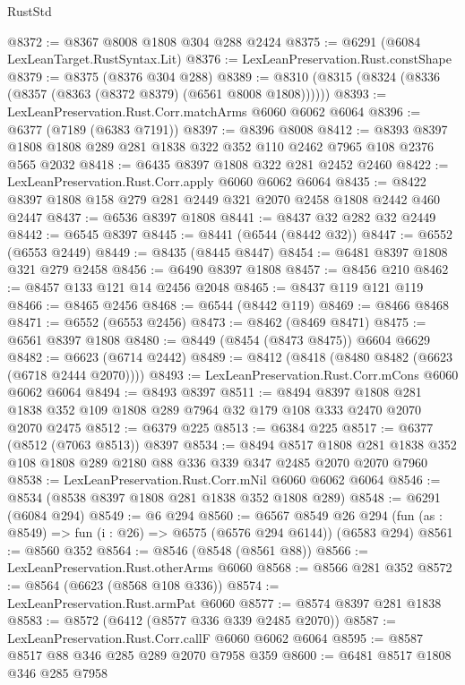 \begin{lexlean}{RustStd}
\begin{coremodule}
@8372 := @8367 @8008 @1808 @304 @288 @2424
@8375 := @6291 (@6084 LexLeanTarget.RustSyntax.Lit)
@8376 := LexLeanPreservation.Rust.constShape
@8379 := @8375 (@8376 @304 @288)
@8389 := @8310 (@8315 (@8324 (@8336 (@8357 (@8363 (@8372 @8379) (@6561 @8008 @1808))))))
@8393 := LexLeanPreservation.Rust.Corr.matchArms @6060 @6062 @6064
@8396 := @6377 (@7189 (@6383 @7191))
@8397 := @8396 @8008
@8412 := @8393 @8397 @1808 @1808 @289 @281 @1838 @322 @352 @110 @2462 @7965 @108 @2376 @565 @2032
@8418 := @6435 @8397 @1808 @322 @281 @2452 @2460
@8422 := LexLeanPreservation.Rust.Corr.apply @6060 @6062 @6064
@8435 := @8422 @8397 @1808 @158 @279 @281 @2449 @321 @2070 @2458 @1808 @2442 @460 @2447
@8437 := @6536 @8397 @1808
@8441 := @8437 @32 @282 @32 @2449
@8442 := @6545 @8397
@8445 := @8441 (@6544 (@8442 @32))
@8447 := @6552 (@6553 @2449)
@8449 := @8435 (@8445 @8447)
@8454 := @6481 @8397 @1808 @321 @279 @2458
@8456 := @6490 @8397 @1808
@8457 := @8456 @210
@8462 := @8457 @133 @121 @14 @2456 @2048
@8465 := @8437 @119 @121 @119
@8466 := @8465 @2456
@8468 := @6544 (@8442 @119)
@8469 := @8466 @8468
@8471 := @6552 (@6553 @2456)
@8473 := @8462 (@8469 @8471)
@8475 := @6561 @8397 @1808
@8480 := @8449 (@8454 (@8473 @8475)) @6604 @6629
@8482 := @6623 (@6714 @2442)
@8489 := @8412 (@8418 (@8480 @8482 (@6623 (@6718 @2444 @2070))))
@8493 := LexLeanPreservation.Rust.Corr.mCons @6060 @6062 @6064
@8494 := @8493 @8397
@8511 := @8494
    @8397
    @1808
    @281
    @1838
    @352
    @109
    @1808
    @289
    @7964
    @32
    @179
    @108
    @333
    @2470
    @2070
    @2070
    @2475
@8512 := @6379 @225
@8513 := @6384 @225
@8517 := @6377 (@8512 (@7063 @8513)) @8397
@8534 := @8494
    @8517
    @1808
    @281
    @1838
    @352
    @108
    @1808
    @289
    @2180
    @88
    @336
    @339
    @347
    @2485
    @2070
    @2070
    @7960
@8538 := LexLeanPreservation.Rust.Corr.mNil @6060 @6062 @6064
@8546 := @8534 (@8538 @8397 @1808 @281 @1838 @352 @1808 @289)
@8548 := @6291 (@6084 @294)
@8549 := @6 @294
@8560 := @6567
    @8549
    @26
    @294
    (fun (as : @8549) => fun (i : @26) => @6575 (@6576 @294 @6144))
    (@6583 @294)
@8561 := @8560 @352
@8564 := @8546 (@8548 (@8561 @88))
@8566 := LexLeanPreservation.Rust.otherArms @6060
@8568 := @8566 @281 @352
@8572 := @8564 (@6623 (@8568 @108 @336))
@8574 := LexLeanPreservation.Rust.armPat @6060
@8577 := @8574 @8397 @281 @1838
@8583 := @8572 (@6412 (@8577 @336 @339 @2485 @2070))
@8587 := LexLeanPreservation.Rust.Corr.callF @6060 @6062 @6064
@8595 := @8587 @8517 @88 @346 @285 @289 @2070 @7958 @359
@8600 := @6481 @8517 @1808 @346 @285 @7958

\end{coremodule}
\end{lexlean}

